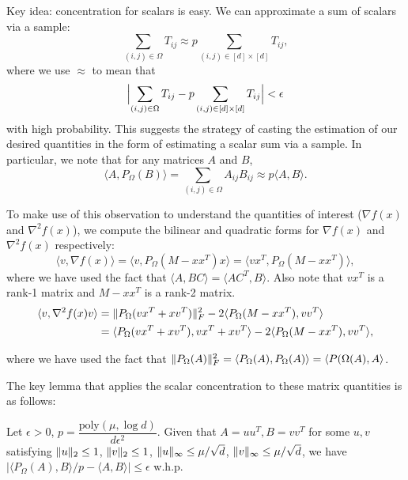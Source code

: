 \begin{remark}
Key idea: concentration for scalars is easy. We can approximate a sum of scalars via a sample:
\begin{equation}
\sum_{(i,j) \in \Omega} T_{ij} \approx p\sum_{(i,j) \in [d]\times[d]} T_{ij},
\end{equation}
where we use $\approx$ to mean that
\begin{equation}
\Bigl| \sum_{(i,j) \in \Omega} T_{ij} - p\sum_{(i,j) \in [d]\times[d]} T_{ij} \Bigr| < \epsilon
\end{equation}
with high probability. This suggests the strategy of casting the estimation of our desired quantities in the form of estimating a scalar sum via a sample. In particular, we note that for any matrices $A$ and $B$,
\begin{equation}
\langle A, P_\Omega(B) \rangle = \sum_{(i,j) \in \Omega} A_{ij}B_{ij} \approx p\langle A, B \rangle.
\end{equation}
\end{remark}

To make use of this observation to understand the quantities of interest ($\nabla f(x)$ and $\nabla^2 f(x)$), we compute the bilinear and quadratic forms for $\nabla f(x)$ and $\nabla^2 f(x)$ respectively:
\begin{equation}
\langle v, \nabla f(x) \rangle = \langle v, P_\Omega(M-xx^T)x \rangle = \langle vx^T, P_\Omega(M-xx^T) \rangle,
\end{equation}
where we have used the fact that $\langle A,BC \rangle = \langle AC^T,B\rangle$. Also note that $vx^T$ is a rank-1 matrix and $M-xx^T$ is a rank-2 matrix.
\begin{align}
\langle v, \nabla^2 f(x) v \rangle &= \|P_\Omega(vx^T + xv^T)\|_F^2 - 2\langle P_\Omega(M-xx^T), vv^T \rangle \\
&=  \langle P_\Omega(vx^T + xv^T), vx^T + xv^T \rangle - 2\langle P_\Omega(M-xx^T), vv^T \rangle,
\end{align}

where we have used the fact that $\|P_\Omega(A)\|_F^2 = \langle P_\Omega(A), P_\Omega(A)\rangle = \langle P(\Omega(A), A\rangle$.

The key lemma that applies the scalar concentration to these matrix quantities is as follows:

\begin{lemma}
Let $\epsilon>0$, $p = \dfrac{\textrm{poly}(\mu, \log d)}{d\epsilon^2}$. Given that $A = uu^T, B=vv^T$ for some $u, v$ satisfying $\|u\|_2 \leq 1$, $\|v\|_2 \leq 1$, $\|u\|_\infty \leq \mu / \sqrt{d}$, $\|v\|_\infty \leq \mu / \sqrt{d}$, we have $|\langle P_\Omega(A), B \rangle/p - \langle A, B\rangle| \leq \epsilon$ w.h.p.
\label{lec11:lem:concentration_lemma}
\end{lemma}

